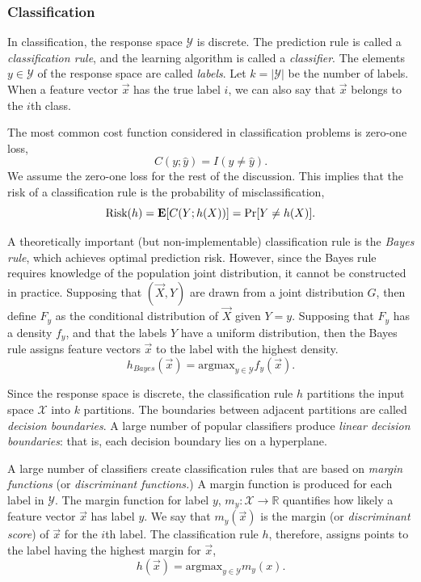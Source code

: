 \subsubsection{Classification}

In classification, the response space $\mathcal{Y}$ is discrete.  The
prediction rule is called a \emph{classification rule}, and the
learning algorithm is called a \emph{classifier}.  The elements $y \in
\mathcal{Y}$ of the response space are called \emph{labels}.  Let $k =
|\mathcal{Y}|$ be the number of labels.  When a feature vector
$\vec{x}$ has the true label $i$, we can also say that $\vec{x}$
belongs to the $i$th class.

The most common cost function considered in classification problems is
zero-one loss,
\[
C(y;\hat{y}) = I(y \neq \hat{y}).
\]
We assume the zero-one loss for the rest of the discussion.  This
implies that the risk of a classification rule is the probability of
misclassification,
\[
\text{Risk}(h) = \textbf{E}[C(Y; h(X))] = \Pr[Y \neq h(X)].
\]

A theoretically important (but non-implementable) classification rule
is the \emph{Bayes rule}, which achieves optimal prediction risk.
However, since the Bayes rule requires knowledge of the population
joint distribution, it cannot be constructed in practice.  Supposing
that $(\vec{X}, Y)$ are drawn from a joint distribution $G$, then
define $F_y$ as the conditional distribution of $\vec{X}$ given $Y =
y$.  Supposing that $F_y$ has a density $f_y$, and that the labels $Y$
have a uniform distribution, then the Bayes rule assigns feature
vectors $\vec{x}$ to the label with the highest density.
\[
h_{Bayes}(\vec{x}) = \text{argmax}_{y \in \mathcal{Y}} f_y(\vec{x}).
\]

Since the response space is discrete, the classification rule $h$
partitions the input space $\mathcal{X}$ into $k$ partitions.  The
boundaries between adjacent partitions are called \emph{decision
  boundaries}.  A large number of popular classifiers produce
\emph{linear decision boundaries}: that is, each decision boundary
lies on a hyperplane.

A large number of classifiers create classification rules that are
based on \emph{margin functions} (or \emph{discriminant functions.})
A margin function is produced for each label in $\mathcal{Y}$.  The
margin function for label $y$, $m_y: \mathcal{X} \to \mathbb{R}$
quantifies how likely a feature vector $\vec{x}$ has label $y$.  We
say that $m_y(\vec{x})$ is the margin (or \emph{discriminant score})
of $\vec{x}$ for the $i$th label.  The classification rule $h$,
therefore, assigns points to the label having the highest margin for
$\vec{x}$,
\[
h(\vec{x}) = \text{argmax}_{y \in \mathcal{Y}} m_y(x).
\]

